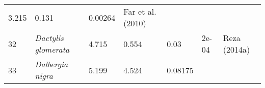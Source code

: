 \documentclass[]{article}
\begin{document}
\begin{longtable}[]{@{}lllllll@{}}
\begin{minipage}[t]{0.08\columnwidth}
3.215\strut
\end{minipage} & \begin{minipage}[t]{0.08\columnwidth}\raggedright
0.131\strut
\end{minipage} & \begin{minipage}[t]{0.08\columnwidth}\raggedright
0.00264\strut
\end{minipage} & \begin{minipage}[t]{0.23\columnwidth}\raggedright
Far et al. (2010)\strut
\end{minipage}\tabularnewline
\begin{minipage}[t]{0.05\columnwidth}\raggedright
32\strut
\end{minipage} & \begin{minipage}[t]{0.23\columnwidth}\raggedright
\emph{Dactylis glomerata}\strut
\end{minipage} & \begin{minipage}[t]{0.05\columnwidth}\raggedright
4.715\strut
\end{minipage} & \begin{minipage}[t]{0.08\columnwidth}\raggedright
0.554\strut
\end{minipage} & \begin{minipage}[t]{0.08\columnwidth}\raggedright
0.03\strut
\end{minipage} & \begin{minipage}[t]{0.08\columnwidth}\raggedright
2e-04\strut
\end{minipage} & \begin{minipage}[t]{0.23\columnwidth}\raggedright
Reza (2014a)\strut
\end{minipage}\tabularnewline
\begin{minipage}[t]{0.05\columnwidth}\raggedright
33\strut
\end{minipage} & \begin{minipage}[t]{0.23\columnwidth}\raggedright
\emph{Dalbergia nigra}\strut
\end{minipage} & \begin{minipage}[t]{0.05\columnwidth}\raggedright
5.199\strut
\end{minipage} & \begin{minipage}[t]{0.08\columnwidth}\raggedright
4.524\strut
\end{minipage} & \begin{minipage}[t]{0.08\columnwidth}\raggedright
0.08175\strut
\end{minipage} & \begin{minipage}[t]{0.08\columnwidth}\raggedright

\end{minipage}
\end{longtable}
\end{document}

